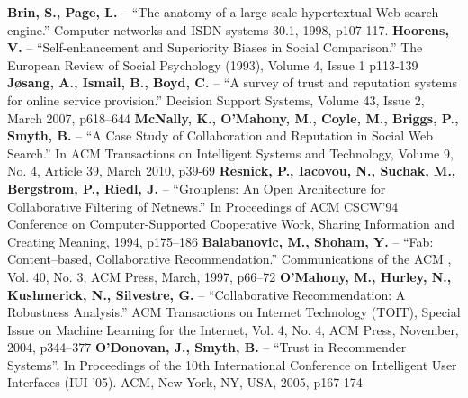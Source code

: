 \documentclass[]{final_report}
\begin{document}
\linebreak
\linebreak
\textbf{Brin, S., Page, L.} -- ``The anatomy of a large-scale hypertextual Web search engine.'' Computer networks and ISDN systems 30.1, 1998, p107-117.
\linebreak
\linebreak
\textbf{Hoorens, V.} -- ``Self-enhancement and Superiority Biases in Social Comparison.'' The European Review of Social Psychology (1993), Volume 4, Issue 1 p113-139
\linebreak
\linebreak
\textbf{Jøsang, A., Ismail, B., Boyd, C.} -- ``A survey of trust and reputation systems for online service provision.'' Decision Support Systems, Volume 43, Issue 2, March 2007, p618–644
\linebreak
\linebreak
\textbf{McNally, K., O'Mahony, M., Coyle, M., Briggs, P., Smyth, B.} -- ``A Case Study of Collaboration and Reputation in Social Web Search.'' In ACM Transactions on Intelligent Systems and Technology, Volume 9, No. 4, Article 39, March 2010, p39-69
\linebreak
\linebreak
\textbf{Resnick, P., Iacovou, N., Suchak, M., Bergstrom, P., Riedl, J.} -- ``Grouplens: An Open Architecture for Collaborative Filtering of Netnews.'' In Proceedings of ACM CSCW’94 Conference on Computer-Supported Cooperative Work, Sharing Information and Creating Meaning, 1994, p175–186
\linebreak
\linebreak
\textbf{Balabanovic, M., Shoham, Y.} -- ``Fab: Content–based, Collaborative Recommendation.'' Communications of the ACM , Vol. 40, No. 3, ACM Press, March, 1997, p66–72
\linebreak
\linebreak
\textbf{O’Mahony, M., Hurley, N., Kushmerick, N., Silvestre, G.} -- ``Collaborative Recommendation: A Robustness Analysis.'' ACM Transactions on Internet Technology (TOIT), Special Issue on Machine Learning for the Internet, Vol. 4, No. 4, ACM Press, November, 2004, p344–377
\linebreak
\linebreak
\textbf{O'Donovan, J., Smyth, B.} -- ``Trust in Recommender Systems''. In Proceedings of the 10th International Conference on Intelligent User Interfaces (IUI '05). ACM, New York, NY, USA, 2005, p167-174




\label{endpage}
\end{document}
